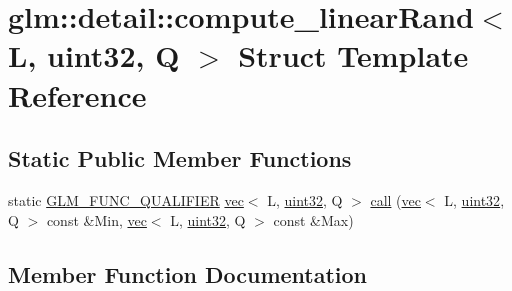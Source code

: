 \hypertarget{structglm_1_1detail_1_1compute__linear_rand_3_01_l_00_01uint32_00_01_q_01_4}{}\section{glm\+:\+:detail\+:\+:compute\+\_\+linear\+Rand$<$ L, uint32, Q $>$ Struct Template Reference}
\label{structglm_1_1detail_1_1compute__linear_rand_3_01_l_00_01uint32_00_01_q_01_4}
\subsection*{Static Public Member Functions}
\begin{DoxyCompactItemize}
\item 
static \hyperlink{setup_8hpp_a33fdea6f91c5f834105f7415e2a64407}{G\+L\+M\+\_\+\+F\+U\+N\+C\+\_\+\+Q\+U\+A\+L\+I\+F\+I\+ER} \hyperlink{structglm_1_1vec}{vec}$<$ L, \hyperlink{namespaceglm_1_1detail_ade6cfbf377022aaa391af8cd50489222}{uint32}, Q $>$ \hyperlink{structglm_1_1detail_1_1compute__linear_rand_3_01_l_00_01uint32_00_01_q_01_4_a1375d1a35189e6e1689b6290aa25c17b}{call} (\hyperlink{structglm_1_1vec}{vec}$<$ L, \hyperlink{namespaceglm_1_1detail_ade6cfbf377022aaa391af8cd50489222}{uint32}, Q $>$ const \&Min, \hyperlink{structglm_1_1vec}{vec}$<$ L, \hyperlink{namespaceglm_1_1detail_ade6cfbf377022aaa391af8cd50489222}{uint32}, Q $>$ const \&Max)
\end{DoxyCompactItemize}


\subsection{Member Function Documentation}
\mbox{\label{structglm_1_1detail_1_1compute__linear_rand_3_01_l_00_01uint32_00_01_q_01_4_a1375d1a35189e6e1689b6290aa25c17b}} 
